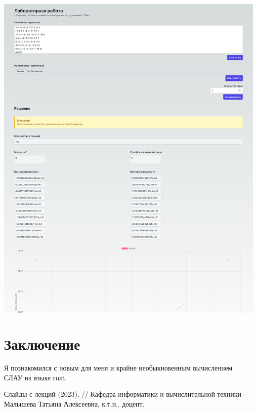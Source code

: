 \documentclass{article}
\begin{document}
\begin{center}
            \includegraphics[scale=0.25]{solution2.png}
      \end{center}
      

\section{Заключение}
Я познакомился с новым для меня и крайне необыкновенным вычислением СЛАУ на языке rust.


\begin{thebibliography}{9}
    Слайды с лекций (2023). // Кафедра информатики и вычислительной техники -- Малышева Татьяна Алексеевна, к.т.н., доцент.
\end{thebibliography} 
\end{document}
